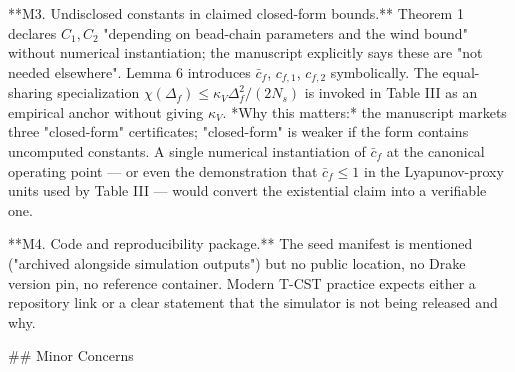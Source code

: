 **M3. Undisclosed constants in claimed closed-form bounds.** Theorem 1 declares $C_1, C_2$ "depending on bead-chain parameters and the wind bound" without numerical instantiation; the manuscript explicitly says these are "not needed elsewhere". Lemma 6 introduces $\bar c_f$, $c_{f,1}$, $c_{f,2}$ symbolically. The equal-sharing specialization $\chi(\Delta_f) \le \kappa_V \Delta_f^2/(2N_s)$ is invoked in Table III as an empirical anchor without giving $\kappa_V$. *Why this matters:* the manuscript markets three "closed-form" certificates; "closed-form" is weaker if the form contains uncomputed constants. A single numerical instantiation of $\bar c_f$ at the canonical operating point — or even the demonstration that $\bar c_f \le 1$ in the Lyapunov-proxy units used by Table III — would convert the existential claim into a verifiable one.

**M4. Code and reproducibility package.** The seed manifest is mentioned ("archived alongside simulation outputs") but no public location, no Drake version pin, no reference container. Modern T-CST practice expects either a repository link or a clear statement that the simulator is not being released and why.

## Minor Concerns

